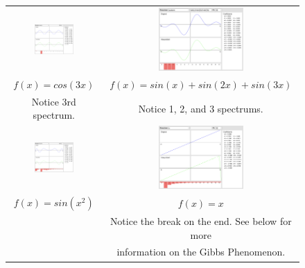 \documentclass[12pt]{article}
\begin{document}
\begin{figure}[htbp]
\centering
\begin{tabular}{cc}
\includegraphics[width=0.45\textwidth]{img-cos3x.png} &
\includegraphics[width=0.45\textwidth]{img-custom.png} \\ [-5pt]

{\footnotesize $f(x) = cos(3x)$} & 
{\footnotesize $f(x) = sin(x)+sin(2x)+sin(3x)$} \\ [-2.5pt]

{\footnotesize Notice 3rd spectrum.} &
{\footnotesize Notice 1, 2, and 3 spectrums.} \\[10pt]

\includegraphics[width=0.45\textwidth]{img-sinx2.png} & 
\includegraphics[width=0.45\textwidth]{img-x.png} \\ [-5pt]

{\footnotesize $f(x) = sin(x^2)$} & 
{\footnotesize $f(x) = x$} \\ [-2.5pt]

{\footnotesize } &
{\footnotesize Notice the break on the end. See below for more } \\[-2.5pt]
{\footnotesize } &
{\footnotesize information on the Gibbs Phenomenon.} \\[10pt]

\end{tabular}
\end{figure}
\end{document}
